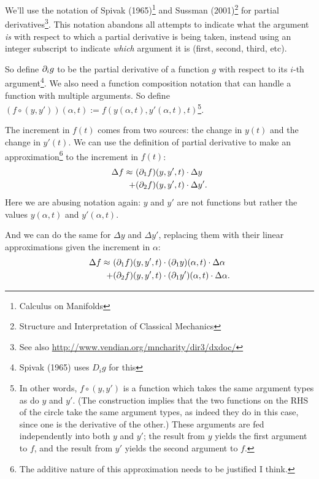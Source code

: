 We'll use the notation of Spivak (1965)\footnote{Calculus on Manifolds} and Sussman
(2001)\footnote{Structure and Interpretation of Classical Mechanics} for partial
derivatives\footnote{See also \url{http://www.vendian.org/mncharity/dir3/dxdoc/}}. This notation
abandons all attempts to indicate what the argument \emph{is} with respect to which a partial
derivative is being taken, instead using an integer subscript to indicate \emph{which} argument it
is (first, second, third, etc).

So define $\partial_i g$ to be the partial derivative of a function $g$ with respect to its $i$-th
argument\footnote{Spivak (1965) uses $D_i g$ for this}. We also need a function composition notation
that can handle a function with multiple arguments. So define
${(f \circ (y, y'))(\alpha, t) := f(y(\alpha, t), y'(\alpha, t), t)}$\footnote{In other words,
  $f \circ (y, y')$ is a function which takes the same argument types as do $y$ and $y'$. (The
  construction implies that the two functions on the RHS of the circle take the same argument types,
  as indeed they do in this case, since one is the derivative of the other.) These arguments are fed
  independently into both $y$ and $y'$; the result from $y$ yields the first argument to $f$, and
  the result from $y'$ yields the second argument to $f$.}.

The increment in $f(t)$ comes from two sources: the change in $y(t)$ and the change in $y'(t)$. We
can use the definition of partial derivative to make an approximation\footnote{The additive nature
  of this approximation needs to be justified I think.} to the increment in $f(t)$:
\begin{align*}
  \Delta f \approx ~ &(\partial_1 f)(y, y', t) \cdot \Delta y \\
                 +   &(\partial_2 f)(y, y', t) \cdot \Delta y'.
\end{align*}
Here we are abusing notation again: $y$ and $y'$ are not functions but rather the values $y(\alpha, t)$
and $y'(\alpha, t)$.

And we can do the same for $\Delta y$ and $\Delta y'$, replacing them with their linear
approximations given the increment in $\alpha$:
\begin{align*}
  \Delta f \approx ~ &(\partial_1 f)(y, y', t) \cdot (\partial_1 y)(\alpha, t) \cdot \Delta \alpha \\
                   + &(\partial_2 f)(y, y', t) \cdot (\partial_1 y')(\alpha, t) \cdot \Delta \alpha.
\end{align*}

